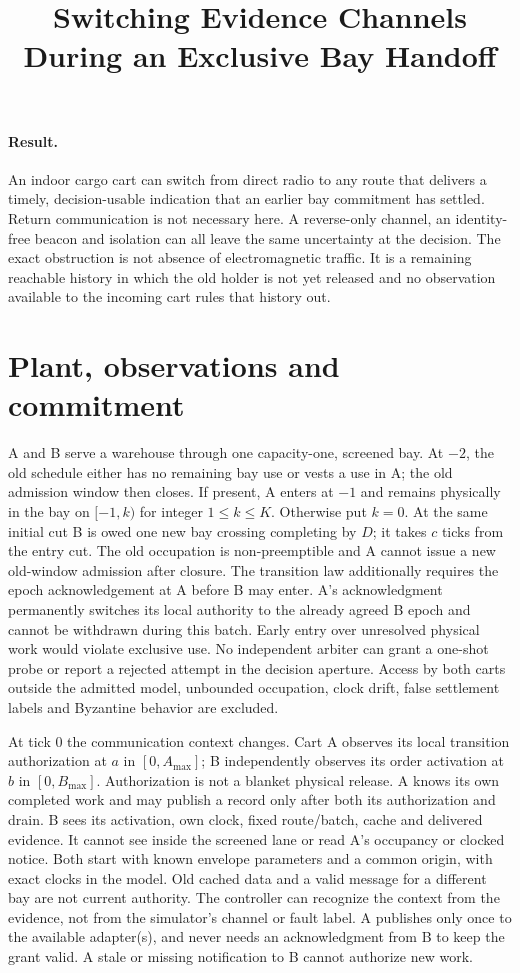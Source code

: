 \documentclass[11pt]{article}
\title{Switching Evidence Channels During an Exclusive Bay Handoff}
\date{}
\begin{document}
\maketitle

\paragraph{Result.}
An indoor cargo cart can switch from direct radio to any route that delivers a timely, decision-usable indication that an earlier bay commitment has settled. Return communication is not necessary here. A reverse-only channel, an identity-free beacon and isolation can all leave the same uncertainty at the decision. The exact obstruction is not absence of electromagnetic traffic. It is a remaining reachable history in which the old holder is not yet released and no observation available to the incoming cart rules that history out.

\section{Plant, observations and commitment}
A and B serve a warehouse through one capacity-one, screened bay. At $-2$, the old schedule either has no remaining bay use or vests a use in A; the old admission window then closes. If present, A enters at $-1$ and remains physically in the bay on $[-1,k)$ for integer $1\le k\le K$. Otherwise put $k=0$. At the same initial cut B is owed one new bay crossing completing by $D$; it takes $c$ ticks from the entry cut. The old occupation is non-preemptible and A cannot issue a new old-window admission after closure. The transition law additionally requires the epoch acknowledgement at A before B may enter. A's acknowledgment permanently switches its local authority to the already agreed B epoch and cannot be withdrawn during this batch. Early entry over unresolved physical work would violate exclusive use. No independent arbiter can grant a one-shot probe or report a rejected attempt in the decision aperture. Access by both carts outside the admitted model, unbounded occupation, clock drift, false settlement labels and Byzantine behavior are excluded.

At tick 0 the communication context changes. Cart A observes its local transition authorization at $a$ in $[0,A_{\max}]$; B independently observes its order activation at $b$ in $[0,B_{\max}]$. Authorization is not a blanket physical release. A knows its own completed work and may publish a record only after both its authorization and drain. B sees its activation, own clock, fixed route/batch, cache and delivered evidence. It cannot see inside the screened lane or read A's occupancy or clocked notice. Both start with known envelope parameters and a common origin, with exact clocks in the model. Old cached data and a valid message for a different bay are not current authority. The controller can recognize the context from the evidence, not from the simulator's channel or fault label. A publishes only once to the available adapter(s), and never needs an acknowledgment from B to keep the grant valid. A stale or missing notification to B cannot authorize new work.
\end{document}
